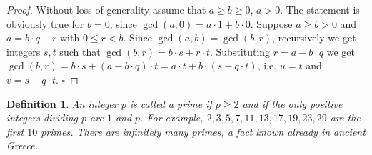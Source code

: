 \documentclass[10pt,varwidth=6in,margin=0.2in,preview]{standalone}
\newtheorem*{_definition}{Definition}
\begin{document}
\begin{flushleft}
\begin{proof}
Without loss of generality assume that $a \ge b \ge 0$, $a > 0$.
The statement is obviously true for $b = 0$, since $\gcd(a, 0) = a \cdot 1 + b \cdot 0$.
Suppose $a \ge b > 0$ and $a = b \cdot q + r$ with $0 \le r < b$.
Since $\gcd(a, b) = \gcd(b, r)$, recursively we get integers $s, t$ such that $\gcd(b, r) = b \cdot s + r \cdot t$.
Substituting $r = a - b \cdot q$ we get $\gcd(b, r) = b \cdot s + (a - b \cdot q) \cdot t = a \cdot t + b \cdot (s - q \cdot t)$, i.e. $u = t$ and $v = s - q \cdot t$. $\square$
\end{proof}

\begin{_definition} An integer $p$ is called a prime if $p \ge 2$ and if the only positive integers dividing $p$ are $1$ and $p$. For example, $2, 3, 5, 7, 11, 13, 17, 19, 23, 29$ are the first $10$ primes. There are infinitely many primes, a fact known already in ancient Greece.
\end{_definition}


\end{flushleft}
\end{document}
